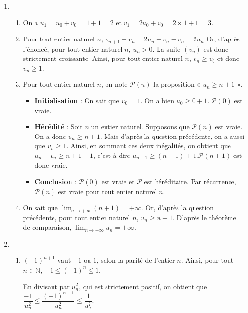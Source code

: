 \documentclass[11pt,fleqn, openany]{book} %
\begin{document}
\begin{solution}\hspace{0pt}
\begin{enumerate}
\item \begin{enumerate}\item  On a \(u_1=u_0+v_0=1+1=2\) et \(v_1=2u_0+v_0=2\times 1 + 1 = 3\).

\item Pour tout entier naturel \(n\), \(v_{n+1}-v_n = 2u_n + v_n-v_n=2u_n\) Or, d'après l'énoncé, pour tout entier naturel \(n\), \(u_n > 0\). La suite \((v_n)\) est donc strictement croissante. Ainsi, pour tout entier naturel \(n\), \(v_n \geqslant v_0\) et donc \(v_n \geqslant 1\).

\item Pour tout entier naturel \(n\), on note \(\mathcal{P}(n)\) la proposition « \(u_n \geqslant n+1\) ».
\begin{itemize}
\item \textbf{Initialisation} : On sait que \(u_0=1\). On a bien \(u_0 \geqslant 0 +1\). \(\mathcal{P}(0)\) est vraie.
\item \textbf{Hérédité} : Soit \(n\) un entier naturel. Supposons que \(\mathcal{P}(n)\) est vraie. On a donc
\(u_n \geqslant n+1\). Mais d'après la question précédente, on a aussi que \(v_n \geqslant 1\). Ainsi, en sommant ces deux inégalités, on obtient que \( u_n + v_n \geqslant n+1 +1\), c'est-à-dire \(u_{n+1} \geqslant (n+1)+1\).\(\mathcal{P}(n+1)\) est donc vraie.
\item \textbf{Conclusion} : \(\mathcal{P}(0)\) est vraie et \(\mathcal{P}\) est héréditaire. Par récurrence, \(\mathcal{P}(n)\) est vraie pour tout entier naturel \(n\).\end{itemize}

\item On sait que \(\displaystyle\lim_{n\to+\infty}(n+1)=+\infty\). Or, d'après la question précédente, pour tout entier naturel \(n\), \(u_n \geqslant n+1\). D'après le théorème de comparaison, \(\displaystyle\lim_{n\to+\infty}u_n=+\infty\).
\end{enumerate}
\item \begin{enumerate}\item \((-1)^{n+1}\) vaut \(-1\) ou \(1\), selon la parité de l'entier \(n\). Ainsi, pour tout \(n\in\mathbb{N}\), $-1 \leqslant (-1)^n \leqslant 1$.

En divisant par \(u_n^2\), qui est strictement positif, on obtient que $\dfrac{-1}{u_n^2} \leqslant \dfrac{(-1)^{n+1}}{u_n^2} \leqslant \dfrac{1}{u_n^2}$.


\end{enumerate}
\end{enumerate}
\end{solution}
\end{document}
